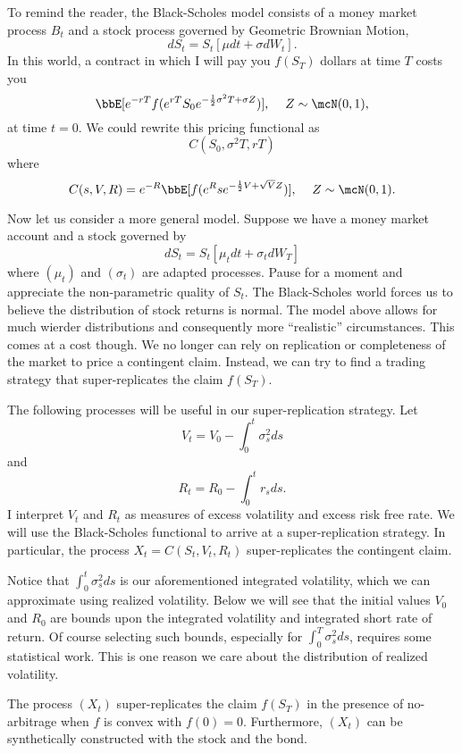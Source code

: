 \documentclass{report}
\begin{document}
To remind the reader, the Black-Scholes model consists of a money
market
process $B_t$ and a stock process governed by Geometric Brownian
Motion,
\[
dS_t = S_t [ \mu dt + \sigma dW_t ].
\]
In this world, a contract in which I will pay you $f(S_T)$ dollars at
time $T$ costs you
\[
\bbE[ e^{-rT} f(e^{r T} S_0 e^{-\frac{1}{2} \sigma^2 T + \sigma Z}) ],
\hspace{12pt} Z \sim \mcN(0,1),
\]
at time $t = 0$.  We could rewrite this pricing functional as
\[
C(S_0, \sigma^2 T, r T)
\]
where
\[
C(s,V,R) = e^{-R} \bbE[ f(e^R s e^{-\frac{1}{2} V + \sqrt{V} Z}) ],
\hspace{12pt} Z \sim \mcN(0,1).
\]

Now let us consider a more general model.  Suppose we have a money
market account and a stock governed by
\[
dS_t = S_t [ \mu_t dt + \sigma_t dW_T ]
\]
where $(\mu_t)$ and $(\sigma_t)$ are adapted processes.  Pause for a
moment and appreciate the non-parametric quality of $S_t$.  The
Black-Scholes world forces us to believe the distribution of stock
returns is normal.  The model above allows for much wierder
distributions and consequently more ``realistic'' circumstances.  This
comes at a cost though.  We no longer can rely on replication or
completeness of the market to price a contingent claim.  Instead, we
can try to find a trading strategy that super-replicates the claim
$f(S_T)$.  

The following processes will be useful in our super-replication
strategy.  Let
\[
V_t = V_0 - \int_0^t \sigma_s^2 ds
\]
and
\[
R_t = R_0 - \int_0^t r_s ds.
\]  
I interpret $V_t$ and $R_t$ as measures of excess volatility and
excess risk free rate.  We will use the Black-Scholes functional to
arrive at a super-replication strategy.  In particular, the process
$X_t = C(S_t, V_t, R_t)$ super-replicates the contingent claim.

Notice that $\int_0^t \sigma_s^2 ds$ is our aforementioned integrated
volatility, which we can approximate using realized volatility.  Below
we will see that the initial values $V_0$ and $R_0$ are bounds upon
the integrated volatility and integrated short rate of return.  Of
course selecting such bounds, especially for $\int_0^T \sigma_s^2 ds$,
requires some statistical work.  This is one reason we care about the
distribution of realized volatility.

\begin{claim}
The process $(X_t)$ super-replicates the claim $f(S_T)$ in the
presence of no-arbitrage when $f$ is convex with $f(0) = 0$. 
Furthermore, $(X_t)$ can be synthetically constructed with the stock
and the bond.
\end{claim}
\end{document}
